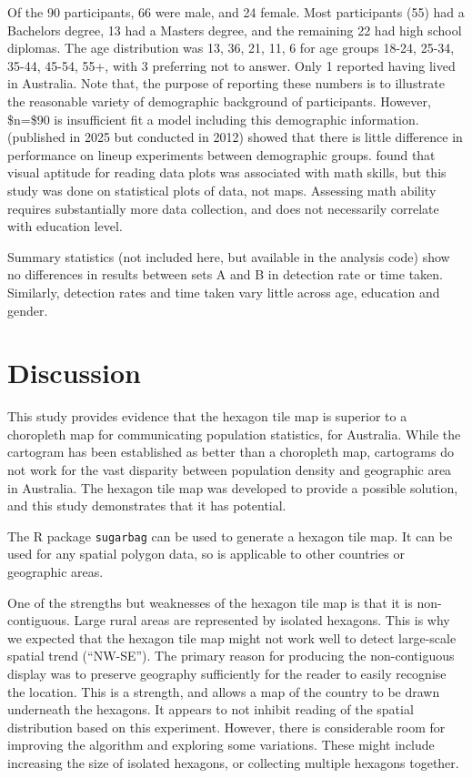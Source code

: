 \documentclass[
doublespace,
  times]{anzsauth}
\begin{document}
Of the 90 participants, 66 were male, and 24 female. Most participants
(55) had a Bachelors degree, 13 had a Masters degree, and the remaining
22 had high school diplomas. The age distribution was 13, 36, 21, 11, 6
for age groups 18-24, 25-34, 35-44, 45-54, 55+, with 3 preferring not to
answer. Only 1 reported having lived in Australia. Note that, the
purpose of reporting these numbers is to illustrate the reasonable
variety of demographic background of participants. However, \$n=\$90 is
insufficient fit a model including this demographic information.
\citet{MHC} (published in 2025 but conducted in 2012) showed that there
is little difference in performance on lineup experiments between
demographic groups. \citet{VH2016} found that visual aptitude for
reading data plots was associated with math skills, but this study was
done on statistical plots of data, not maps. Assessing math ability
requires substantially more data collection, and does not necessarily
correlate with education level.

Summary statistics (not included here, but available in the analysis
code) show no differences in results between sets A and B in detection
rate or time taken. Similarly, detection rates and time taken vary
little across age, education and gender.

\section{Discussion}\label{discussion}

This study provides evidence that the hexagon tile map is superior to a
choropleth map for communicating population statistics, for Australia.
While the cartogram has been established as better than a choropleth
map, cartograms do not work for the vast disparity between population
density and geographic area in Australia. The hexagon tile map was
developed to provide a possible solution, and this study demonstrates
that it has potential.

The R package \texttt{sugarbag} can be used to generate a hexagon tile
map. It can be used for any spatial polygon data, so is applicable to
other countries or geographic areas.

One of the strengths but weaknesses of the hexagon tile map is that it
is non-contiguous. Large rural areas are represented by isolated
hexagons. This is why we expected that the hexagon tile map might not
work well to detect large-scale spatial trend (``NW-SE''). The primary
reason for producing the non-contiguous display was to preserve
geography sufficiently for the reader to easily recognise the location.
This is a strength, and allows a map of the country to be drawn
underneath the hexagons. It appears to not inhibit reading of the
spatial distribution based on this experiment. However, there is
considerable room for improving the algorithm and exploring some
variations. These might include increasing the size of isolated
hexagons, or collecting multiple hexagons together.
\end{document}
